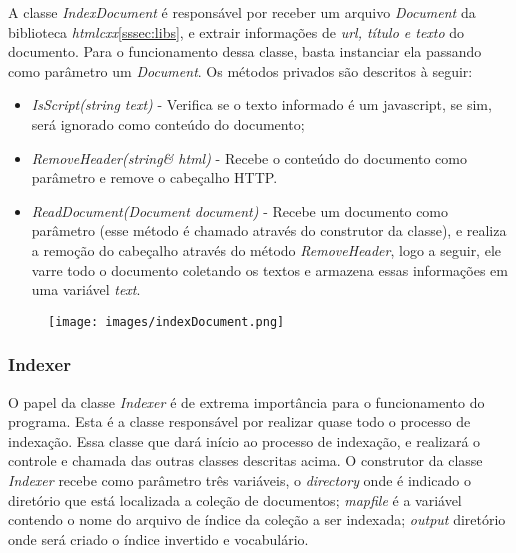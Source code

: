 \documentclass[12pt]{article}
\begin{document}
A classe \textit{IndexDocument} é responsável por receber um arquivo \textit{Document} da biblioteca \textit{htmlcxx}\ref{sssec:libs}, e extrair informações de \textit{url, título e texto} do documento. Para o funcionamento dessa classe, basta instanciar ela passando como parâmetro um \textit{Document}. Os métodos privados são descritos à seguir: 
\begin{itemize}
\item \textit{IsScript(string text)} - Verifica se o texto informado é um javascript, se sim, será ignorado como conteúdo do documento;
\item \textit{RemoveHeader(string\& html)} - Recebe o conteúdo do documento como parâmetro e remove o cabeçalho HTTP.
\item \textit{ReadDocument(Document document)} - Recebe um documento como parâmetro (esse método é chamado através do construtor da classe), e realiza a remoção do cabeçalho através do método \textit{RemoveHeader}, logo a seguir, ele varre todo o documento coletando os textos e armazena essas informações em uma variável \textit{text}.
\end{itemize}

\begin{figure}[ht]
\centering
\texttt{[image: images/indexDocument.png]}
\label{fig:indexDocument}
\end{figure}

\subsubsection{Indexer} \label{sssec:indexer}

O papel da classe \textit{Indexer} é de extrema importância para o funcionamento do programa. Esta é a classe responsável por realizar quase todo o processo de indexação. Essa classe que dará início ao processo de indexação, e realizará o controle e chamada das outras classes descritas acima. O construtor da classe \textit{Indexer} recebe como parâmetro três variáveis, o \textit{directory} onde é indicado o diretório que está localizada a coleção de documentos; \textit{mapfile} é a variável contendo o nome do arquivo de índice da coleção a ser indexada; \textit{output} diretório onde será criado o índice invertido e vocabulário.
\end{document}
